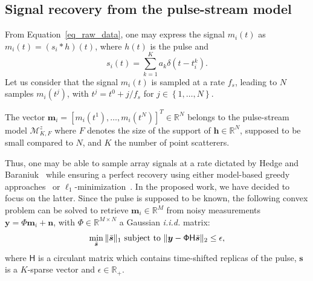 \documentclass{article}
\newcommand{\vect}[1]{\bm{#1}}
\newcommand{\mat}[1]{\mathsf{#1}}
\newcommand{\ser}[2]{#1^{#2}}
\theoremstyle{definition}
\begin{document}
\subsection{Signal recovery from the pulse-stream model}
\label{subsec_US_pulsestream}
From Equation~\eqref{eq_raw_data}, one may express the signal $m_i\left(t\right)$ as $m_i\left(t\right) = \left(s_i \ast h\right)\left(t\right)$, where $h\left(t\right)$ is the pulse and 
\begin{equation}
 s_i \left(t\right) = \sum \limits_{k=1}^{K} a_k \delta\left(t - \ser{t_i}{k}\right).
\end{equation} 
Let us consider that the signal $m_i \left(t\right)$ is sampled at a rate $f_s$, leading to $N$ samples $ m_i \left(\ser{t}{j}\right)$, with $\ser{t}{j}= \ser{t}{0} + j/f_s$ for $j \in \left\lbrace 1,\dots,N \right\rbrace$.

The vector $\vect{m}_i = \left[m_i\left(\ser{t}{1}\right),\dots,m_i\left(\ser{t}{N}\right)\right]^T \in \mathbb{R}^N$ belongs to the pulse-stream model $\mathcal{M}^z_{K,F}$ where $F$ denotes the size of the support of $\vect{h} \in \mathbb{R}^N$, supposed to be small compared to $N$, and $K$ the number of point scatterers.

Thus, one may be able to sample array signals at a rate dictated by Hedge and Baraniuk~\cite{Hedge_TSP_2011} while ensuring a perfect recovery using either model-based greedy approaches~\cite{Baraniuk2010} or $\ell_1$-minimization~\cite{candes11}. 
In the proposed work, we have decided to focus on the latter. Since the pulse is supposed to be known, the following convex problem can be solved to retrieve $\vect{m}_i \in \mathbb{R}^M$ from noisy measurements $\vect{y} = \mathsf{\Phi} \vect{m}_i + \vect{n}$, with $\mathsf{\Phi} \in \mathbb{R}^{M \times N}$ a Gaussian \textit{i.i.d.} matrix:
\begin{equation}
\label{eq_l1_BPDN}
\min_{\bar{\vect{s}}}\|\bar{\vect{s}}\|_{1}
\textnormal{ subject to }\| \bm{y}-\mat{\Phi H}\bar{\vect{s}}\|_{2}\leq\epsilon,
\end{equation}
where $\mat{H}$ is a circulant matrix which contains time-shifted replicas of the pulse, $\vect{s}$ is a $K$-sparse vector and $\epsilon \in \mathbb{R}_{+}$.
\end{document}

